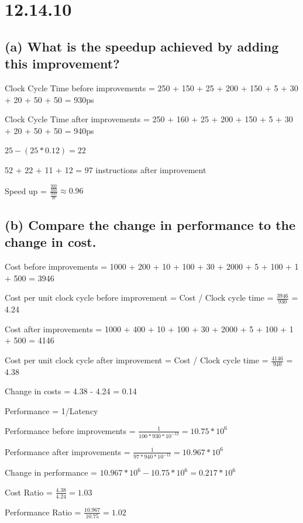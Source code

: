 \documentclass{article}
\begin{document}
    \newpage

    \section*{12.14.10}

    \subsection*{(a) What is the speedup achieved by adding this improvement?}

    Clock Cycle Time before improvements = 250 + 150 + 25 + 200 + 150 + 5 + 30 + 20 + 50 + 50 = 930ps

    Clock Cycle Time after improvements = 250 + 160 + 25 + 200 + 150 + 5 + 30 + 20 + 50 + 50 = 940ps

    $25 - (25 * 0.12) = 22$

    52 + 22 + 11 + 12 = 97 instructions after improvement

    Speed up = $\frac{\frac{930}{100}}{\frac{930}{97}} \approx 0.96$
    
    \subsection*{(b) Compare the change in performance to the change in
    cost.}

    Cost before improvements = 1000 + 200 + 10 + 100 + 30 + 2000 + 5 + 100 + 1 + 500 = 3946

    Cost per unit clock cycle before improvement = Cost / Clock cycle time = $\frac{3946}{930}$ = 4.24

    Cost after improvements = 1000 + 400 + 10 + 100 + 30 + 2000 + 5 + 100 + 1 + 500 = 4146

    Cost per unit clock cycle after improvement = Cost / Clock cycle time = $\frac{4146}{940}$ = 4.38

    Change in costs = 4.38 - 4.24 = 0.14

    Performance = 1/Latency

    Performance before improvements = $\frac{1}{100 * 930 * 10^{-12}} = 10.75 * 10^6$

    Performance after improvements = $\frac{1}{97 * 940 * 10^{-12}} = 10.967 * 10^6$

    Change in performance = $10.967 * 10^6 - 10.75 * 10^6 = 0.217 * 10^6$

    Cost Ratio = $\frac{4.38}{4.24} = 1.03$

    Performance Ratio = $\frac{10.967}{10.75} = 1.02$
\end{document}
